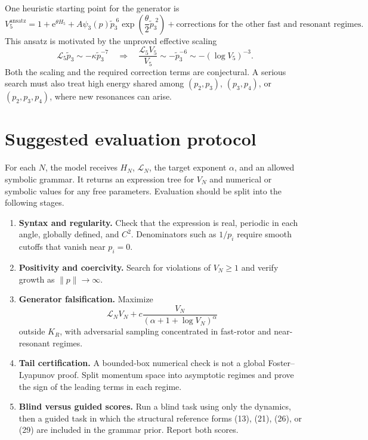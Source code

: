 \documentclass[11pt]{article}
\newcommand{\1}{\mathbf{1}}
\newcommand{\cL}{\mathcal{L}}
\newcommand{\ee}{\mathrm{e}}
\newcommand{\wt}[1]{\widetilde{#1}}
\begin{document}
One heuristic starting point for the generator is
\begin{equation}
V_5^{\mathrm{ansatz}}=1+\ee^{\theta H_5}
+A\psi_3(p)\wt p_3^{\;6}\exp\!\left(\frac\theta2\wt p_3^{\;2}\right)
+\text{corrections for the other fast and resonant regimes}.
\end{equation}
This ansatz is motivated by the unproved effective scaling
\[
\cL_5\wt p_3\sim-\kappa\wt p_3^{-7}
\quad\Longrightarrow\quad
\frac{\cL_5V_5}{V_5}\sim-\wt p_3^{-6}\sim-(\log V_5)^{-3}.
\]
Both the scaling and the required correction terms are conjectural. A serious search must also treat high energy shared among $(p_2,p_3)$, $(p_3,p_4)$, or $(p_2,p_3,p_4)$, where new resonances can arise.

\section{Suggested evaluation protocol}
For each $N$, the model receives $H_N$, $\cL_N$, the target exponent $\alpha$, and an allowed symbolic grammar. It returns an expression tree for $V_N$ and numerical or symbolic values for any free parameters. Evaluation should be split into the following stages.

\begin{enumerate}[leftmargin=*,itemsep=0.75em]
\item \textbf{Syntax and regularity.} Check that the expression is real, periodic in each angle, globally defined, and $C^2$. Denominators such as $1/p_i$ require smooth cutoffs that vanish near $p_i=0$.

\item \textbf{Positivity and coercivity.} Search for violations of $V_N\ge1$ and verify growth as $\lVert p\rVert\to\infty$.

\item \textbf{Generator falsification.} Maximize
\[
\cL_NV_N+c\frac{V_N}{(\alpha+1+\log V_N)^\alpha}
\]
outside $K_R$, with adversarial sampling concentrated in fast-rotor and near-resonant regimes.

\item \textbf{Tail certification.} A bounded-box numerical check is not a global Foster--Lyapunov proof. Split momentum space into asymptotic regimes and prove the sign of the leading terms in each regime.

\item \textbf{Blind versus guided scores.} Run a blind task using only the dynamics, then a guided task in which the structural reference forms (13), (21), (26), or (29) are included in the grammar prior. Report both scores.
\end{enumerate}
\end{document}
